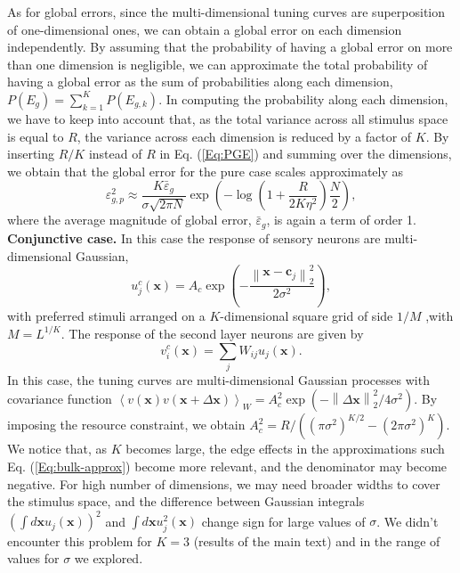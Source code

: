 \documentclass[a4paper]{article}%
\begin{document}
As for global errors, since the multi-dimensional tuning curves are
superposition of one-dimensional ones, we can obtain a global error on each
dimension independently. By assuming that the probability of having a global
error on more than one dimension is negligible, we can approximate the total
probability of having a global error as the sum of probabilities along each
dimension, $P(E_{g}) = \sum_{k=1}^{K} P(E_{g,k})$. In computing the
probability along each dimension, we have to keep into account that, as the
total variance across all stimulus space is equal to $R$, the variance across
each dimension is reduced by a factor of $K$. By inserting $R/K$ instead of
$R$ in Eq. (\ref{Eq:PGE}) and summing over the dimensions, we obtain that the
global error for the pure case scales approximately as
\begin{equation}
\varepsilon_{g,p}^{2} \approx\frac{K\bar{\varepsilon}_{g} }{\sigma\sqrt{2\pi
N}} \exp{\left(  -\log\left(  1 + \frac{R} {2 K \eta^{2}}\right)  \frac{N}{2}
\right)  }, \label{Eq:multi-global-pure}%
\end{equation}
where the average magnitude of global error, $\bar{\varepsilon}_{g}$, is again
a term of order 1. \newline\newline\textbf{Conjunctive case.} In this case the
response of sensory neurons are multi-dimensional Gaussian,
\begin{equation}
u^{c}_{j}\left(  \mathbf{x}\right)  =A_{c} \exp{\left(  -\frac{\left\|
\mathbf{x}-\mathbf{c}_{j}\right\|  _{2}^{2}} {2\sigma^{2}}\right)  },
\end{equation}
with preferred stimuli arranged on a $K$-dimensional square grid of side $1/M$
,with $M = L^{1/K}$. The response of the second layer neurons are given by
\begin{equation}
v^{c}_{i}(\mathbf{x}) = \sum_{j} W_{ij} u_{j}(\mathbf{x}).
\end{equation}
In this case, the tuning curves are multi-dimensional Gaussian processes with
covariance function $\left\langle v(\mathbf{x})v(\mathbf{x} + \Delta
\mathbf{x}) \right\rangle _{W} = A_{c}^{2} \exp{\left(  -\left\|
\Delta\mathbf{x}\right\|  _{2}^{2}/4\sigma^{2} \right)  }$. By imposing the
resource constraint, we obtain $A_{c}^{2} = R/\left(  \left(  \pi\sigma
^{2}\right)  ^{K/2} - (2\pi\sigma^{2})^{K} \right)  $. We notice that, as $K$
becomes large, the edge effects in the approximations such Eq.
(\ref{Eq:bulk-approx}) become more relevant, and the denominator may become
negative. For high number of dimensions, we may need broader widths to cover
the stimulus space, and the difference between Gaussian integrals $\left(
\int d\mathbf{x} u_{j}(\mathbf{x})\right)  ^{2}$ and $\int d\mathbf{x}
u_{j}^{2}(\mathbf{x})$ change sign for large values of $\sigma$. We didn't
encounter this problem for $K=3$ (results of the main text) and in the range
of values for $\sigma$ we explored.
\end{document}
